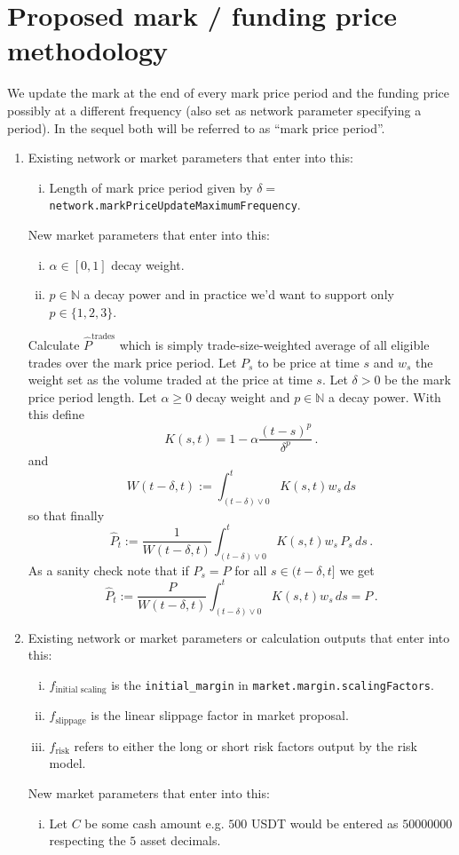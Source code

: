 \documentclass[10pt]{article}
\begin{document}
\section{Proposed mark / funding price methodology}
We update the mark at the end of every mark price period and the funding price possibly at a different frequency (also set as network parameter specifying a period). 
In the sequel both will be referred to as ``mark price period''.
\begin{enumerate}
\item 
Existing network or market parameters that enter into this:
\begin{enumerate}[i)]
\item Length of mark price period given by $\delta = $\texttt{network.markPriceUpdateMaximumFrequency}.
\end{enumerate}
New market parameters that enter into this:
\begin{enumerate}[i)]
\item $\alpha \in [0,1]$ decay weight. 
\item $p \in \mathbb N$ a decay power and in practice we'd want to support only $p \in \{1,2,3\}$.
\end{enumerate}

Calculate $\hat P^{\text{trades}}$ which is simply trade-size-weighted average of all eligible trades over the mark price period. 
Let $P_s$ to be price at time $s$ and $w_s$ the weight set as the volume traded at the price at time $s$.
Let $\delta > 0$ be the mark price period length. 
Let $\alpha \geq 0$ decay weight and $p\in \mathbb N$ a decay power. 
With this define
\[
K(s,t) = 1 - \alpha\frac{(t-s)^p}{\delta^p}\,.
\]
and 
\[
W(t-\delta, t) := \int_{(t-\delta) \vee 0}^t K(s,t) w_s \,ds
\]
so that finally
\[
\hat P_t := \frac{1}{W(t-\delta, t)} \int_{(t-\delta) \vee 0}^t K(s,t) w_s \,P_s \,ds\,.
\]
As a sanity check note that if $P_s = P$ for all $s\in (t-\delta, t]$ we get 
\[
\hat P_t := \frac{P}{W(t-\delta, t)} \int_{(t-\delta) \vee 0}^t K(s,t) w_s \,ds = P\,.
\]


\item 
Existing network or market parameters or calculation outputs that enter into this:
\begin{enumerate}[i)]
\item $f_\text{initial scaling}$ is the \texttt{initial\_margin} in \texttt{market.margin.scalingFactors}.
\item $f_\text{slippage}$ is the linear slippage factor in market proposal.
\item $f_\text{risk}$ refers to either the long or short risk factors output by the risk model. 
\end{enumerate}
New market parameters that enter into this:
\begin{enumerate}[i)]
\item Let $C$ be some cash amount e.g. $500$ USDT would be entered as $500 00000$ respecting the $5$ asset decimals.
\end{enumerate}



\end{enumerate}
\end{document}
